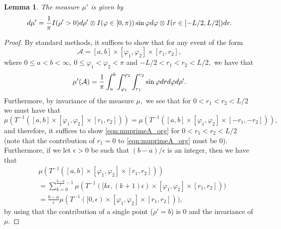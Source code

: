 \documentclass[10pt,a4paper]{amsart}
\newcommand{\CA}{{\mathcal{A}}}
\newcommand{\dd}{{\rm d}}
\newtheorem{lemma}[theorem]{Lemma}
\begin{document}
\begin{lemma} \label{lemma:altPoisson}
The measure $\mu'$ is given by 
\[
\dd \mu'= \frac{1}{\pi}I(\rho'>0)\dd \rho' 
\otimes I(\varphi\in[0,\pi))\sin \varphi \dd \varphi
\otimes I(r\in[-L/2,L/2])\dd r.
\]
\end{lemma}
\begin{proof}
By standard methods, it suffices to show that for any event of the form 
\[
\CA=[a,b] \times [\varphi_1,\varphi_2]\times [r_1,r_2] ,
\]
where $0\leq a<b<\infty,\ 0\leq \varphi_1<\varphi_2<\pi$ and $-L/2<r_1<r_2<L/2,$ 
we have that 
\begin{equation} \label{eqn:muprimeA_org} 
\mu'(\CA)=\frac{1}{\pi}
\int_{a}^b \int_{\varphi_1}^{\varphi_2} \int_{r_1}^{r_2} 
\sin \varphi  \dd r \dd \varphi  \dd \rho'.    
\end{equation}
Furthermore, by invariance of the measure $\mu,$ we see that for $0<r_1<r_2<L/2$ we must have that
\[
\mu(T^{-1}([a,b] \times [\varphi_1,\varphi_2]\times [r_1,r_2] ))
=\mu(T^{-1}([a,b] \times [\varphi_1,\varphi_2]\times [-r_1,-r_2] )),
\]
and therefore, it suffices to show \eqref{eqn:muprimeA_org} for $0<r_1<r_2<L/2$
(note that the contribution of $r_1=0$ to \eqref{eqn:muprimeA_org} must be 0).
Furthermore, if we let $\epsilon>0$ be such that $(b-a)/\epsilon$ is an integer,
then we have that 
\begin{align*}
& \mu(T^{-1}([a,b] \times [\varphi_1,\varphi_2]\times [r_1,r_2] )) \\
& =\sum_{k=0}^{\frac{b-a}{\epsilon}-1}  
\mu(T^{-1}([k\epsilon,(k+1)\epsilon) \times [\varphi_1,\varphi_2]\times [r_1,r_2] )) \\
& =\frac{b-a}{\epsilon}\mu(T^{-1}([0,\epsilon) 
\times [\varphi_1,\varphi_2] \times [r_1,r_2] )), 
\end{align*}
by using that the contribution of a single point ($\rho'=b$) is 0 and the invariance of $\mu.$



\end{proof}
\end{document}
